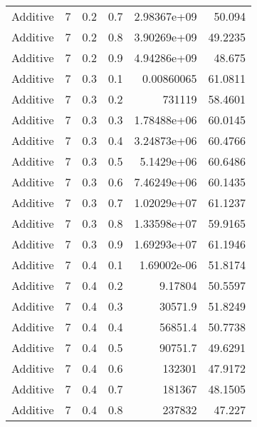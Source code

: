 \documentclass{article}
\begin{document}
\begin{longtable}[H]{lrrrrr}
 Additive       &       7 &   0.2 &            0.7 &      2.98367e+09 &         50.094  \\
 Additive       &       7 &   0.2 &            0.8 &      3.90269e+09 &         49.2235 \\
 Additive       &       7 &   0.2 &            0.9 &      4.94286e+09 &         48.675  \\
 Additive       &       7 &   0.3 &            0.1 &      0.00860065  &         61.0811 \\
 Additive       &       7 &   0.3 &            0.2 & 731119           &         58.4601 \\
 Additive       &       7 &   0.3 &            0.3 &      1.78488e+06 &         60.0145 \\
 Additive       &       7 &   0.3 &            0.4 &      3.24873e+06 &         60.4766 \\
 Additive       &       7 &   0.3 &            0.5 &      5.1429e+06  &         60.6486 \\
 Additive       &       7 &   0.3 &            0.6 &      7.46249e+06 &         60.1435 \\
 Additive       &       7 &   0.3 &            0.7 &      1.02029e+07 &         61.1237 \\
 Additive       &       7 &   0.3 &            0.8 &      1.33598e+07 &         59.9165 \\
 Additive       &       7 &   0.3 &            0.9 &      1.69293e+07 &         61.1946 \\
 Additive       &       7 &   0.4 &            0.1 &      1.69002e-06 &         51.8174 \\
 Additive       &       7 &   0.4 &            0.2 &      9.17804     &         50.5597 \\
 Additive       &       7 &   0.4 &            0.3 &  30571.9         &         51.8249 \\
 Additive       &       7 &   0.4 &            0.4 &  56851.4         &         50.7738 \\
 Additive       &       7 &   0.4 &            0.5 &  90751.7         &         49.6291 \\
 Additive       &       7 &   0.4 &            0.6 & 132301           &         47.9172 \\
 Additive       &       7 &   0.4 &            0.7 & 181367           &         48.1505 \\
 Additive       &       7 &   0.4 &            0.8 & 237832           &         47.227  \\

\end{longtable}
\end{document}
